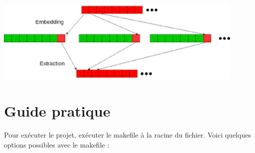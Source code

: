 \includegraphics[width=12cm]{lsb.eps}\\


\section {Guide pratique}
Pour exécuter le projet, exécuter le makefile à la racine du fichier.
Voici quelques options possibles avec le makefile : \\
